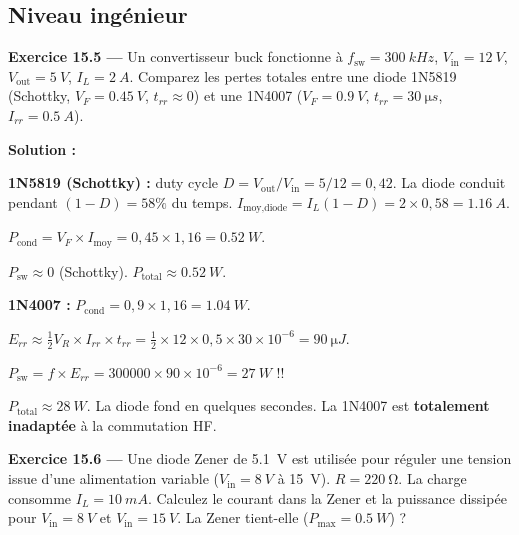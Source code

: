 \documentclass[12pt,a4paper,twoside]{book}
\begin{document}
\subsection*{Niveau ingénieur}

\textbf{Exercice 15.5 ---} Un convertisseur buck fonctionne à $f_{\text{sw}} = \SI{300}{kHz}$, $V_{\text{in}} = \SI{12}{V}$, $V_{\text{out}} = \SI{5}{V}$, $I_L = \SI{2}{A}$. Comparez les pertes totales entre une diode 1N5819 (Schottky, $V_F = \SI{0.45}{V}$, $t_{rr} \approx 0$) et une 1N4007 ($V_F = \SI{0.9}{V}$, $t_{rr} = \SI{30}{\micro s}$, $I_{rr} = \SI{0.5}{A}$).

\begin{pratique}
\textbf{Solution :}

\textbf{1N5819 (Schottky) :} duty cycle $D = V_{\text{out}}/V_{\text{in}} = 5/12 = 0{,}42$. La diode conduit pendant $(1-D) = 58\%$ du temps. $I_{\text{moy,diode}} = I_L(1-D) = 2\times0{,}58 = \SI{1.16}{A}$.

$P_{\text{cond}} = V_F \times I_{\text{moy}} = 0{,}45 \times 1{,}16 = \SI{0.52}{W}$.

$P_{\text{sw}} \approx 0$ (Schottky). $P_{\text{total}} \approx \SI{0.52}{W}$.

\textbf{1N4007 :} $P_{\text{cond}} = 0{,}9 \times 1{,}16 = \SI{1.04}{W}$.

$E_{rr} \approx \frac{1}{2}V_R \times I_{rr} \times t_{rr} = \frac{1}{2}\times12\times0{,}5\times30\times10^{-6} = \SI{90}{\micro J}$.

$P_{\text{sw}} = f \times E_{rr} = 300000\times90\times10^{-6} = \SI{27}{W}$ !!

$P_{\text{total}} \approx \SI{28}{W}$. La diode fond en quelques secondes. La 1N4007 est \textbf{totalement inadaptée} à la commutation HF.
\end{pratique}

\textbf{Exercice 15.6 ---} Une diode Zener de \SI{5.1}{V} est utilisée pour réguler une tension issue d'une alimentation variable ($V_{\text{in}} = \SI{8}{V}$ à \SI{15}{V}). $R = \SI{220}{\ohm}$. La charge consomme $I_L = \SI{10}{mA}$. Calculez le courant dans la Zener et la puissance dissipée pour $V_{\text{in}} = \SI{8}{V}$ et $V_{\text{in}} = \SI{15}{V}$. La Zener tient-elle ($P_{\max} = \SI{0.5}{W}$) ?
\end{document}
